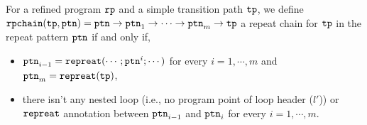 \begin{enumerate}
\begin{enumerate}
\begin{defn}
    \label{def:repeatchain-loop}
  For a refined program $\mathtt{rp}$ and a simple transition path $\mathtt{tp}$, we define
  $\mathtt{rpchain}(\mathtt{tp}, \mathtt{ptn}) = \mathtt{ptn} \to \mathtt{ptn}_1 \to \cdots \to \mathtt{ptn}_{m} \to \mathtt{tp}$
  a repeat chain for $\mathtt{tp}$ in the repeat pattern $\mathtt{ptn}$
  if and only if,
  \begin{itemize}
    \item  $\mathtt{ptn}_{i - 1} = \mathtt{repreat}(\cdots; \mathtt{ptn}^{i}; \cdots)$ for every $i = 1, \cdots, m$ and $\mathtt{ptn}_m = \mathtt{repreat}(\mathtt{tp})$,
    \item 
    there isn't any nested loop (i.e., no program point of loop header ($l'$)) or $\mathtt{repreat}$ annotation between $\mathtt{ptn}_{i - 1}$ and $\mathtt{ptn}_{i}$
    for every $i = 1, \cdots, m$.
  \end{itemize}
  \end{defn}
%

\end{enumerate}
\end{enumerate}
